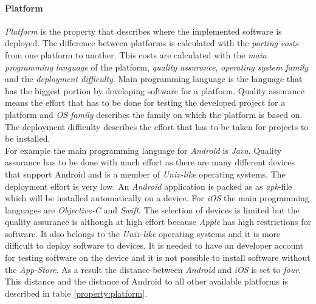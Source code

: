 \paragraph*{\textbf{Platform}}
\textit{Platform} is the property that describes where the implemented software is deployed. The difference between platforms is calculated with the \textit{porting costs} from one platform to another. This costs are calculated with the \textit{main programming language} of the platform, \textit{quality assurance}, \textit{operating system family} and the \textit{deployment difficulty}. Main programming language is the language that has the biggest portion by developing software for a platform. Quality assurance means the effort that has to be done for testing the developed project for a platform and \textit{OS family} describes the family on which the platform is based on. The deployment difficulty describes the effort that has to be taken for projects to be installed.\\
For example the main programming language for \textit{Android} is \textit{Java}. Quality assurance has to be done with much effort as there are many different devices that support Android and is a member of \textit{Unix-like} operating systems. The deployment effort is very low. An \textit{Android} application is packed as as \textit{apk}-file which will be installed automatically on a device. For \textit{iOS} the main programming languages are \textit{Objective-C} and \textit{Swift}. The selection of devices is limited but the quality assurance is although at high effort because \textit{Apple} has high restrictions for software. It also belongs to the \textit{Unix-like} operating systems and it is more difficult to deploy software to devices. It is needed to have an developer account for testing software on the device and it is not possible to install software without the \textit{App-Store}. As a result the distance between \textit{Android} and \textit{iOS} is set to \textit{four}. This distance and the distance of Android to all other available platforms is described in table \ref{property:platform}.
